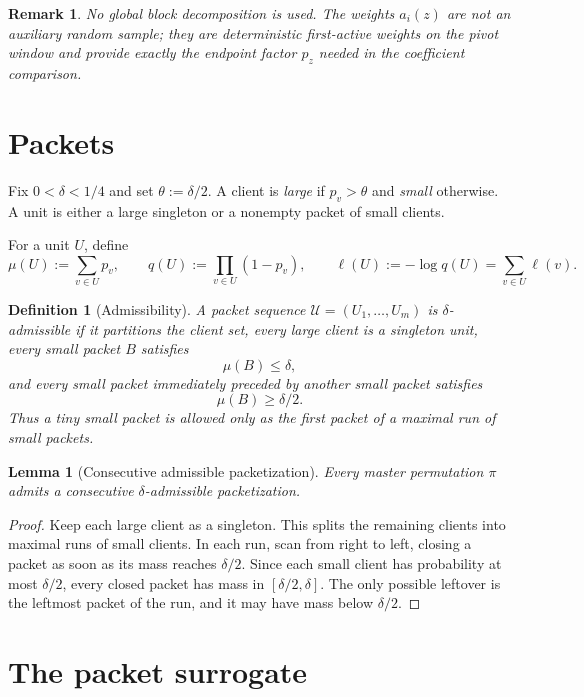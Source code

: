 \documentclass[11pt]{article}
\newtheorem{lemma}{Lemma}
\newtheorem{definition}{Definition}
\newtheorem{remark}{Remark}
\begin{document}
\begin{remark}
No global block decomposition is used.  The weights $a_i(z)$ are not an
auxiliary random sample; they are deterministic first-active weights on the
pivot window and provide exactly the endpoint factor $p_z$ needed in the
coefficient comparison.
\end{remark}

\section{Packets}

Fix $0<\delta<1/4$ and set $\theta:=\delta/2$.  A client is \emph{large} if
$p_v>\theta$ and \emph{small} otherwise.  A unit is either a large singleton or
a nonempty packet of small clients.

For a unit $U$, define
\[
    \mu(U):=\sum_{v\in U}p_v,
    \qquad
    q(U):=\prod_{v\in U}(1-p_v),
    \qquad
    \ell(U):=-\log q(U)=\sum_{v\in U}\ell(v).
\]

\begin{definition}[Admissibility]
A packet sequence $\mathcal U=(U_1,\dots,U_m)$ is $\delta$-admissible if it
partitions the client set, every large client is a singleton unit, every small
packet $B$ satisfies
\[
    \mu(B)\le\delta,
\]
and every small packet immediately preceded by another small packet satisfies
\[
    \mu(B)\ge\delta/2.
\]
Thus a tiny small packet is allowed only as the first packet of a maximal run of
small packets.
\end{definition}

\begin{lemma}[Consecutive admissible packetization]\label{lem:existence}
Every master permutation $\pi$ admits a consecutive $\delta$-admissible
packetization.
\end{lemma}

\begin{proof}
Keep each large client as a singleton.  This splits the remaining clients into
maximal runs of small clients.  In each run, scan from right to left, closing a
packet as soon as its mass reaches $\delta/2$.  Since each small client has
probability at most $\delta/2$, every closed packet has mass in
$[\delta/2,\delta]$.  The only possible leftover is the leftmost packet of the
run, and it may have mass below $\delta/2$.
\end{proof}

\section{The packet surrogate}
\end{document}
